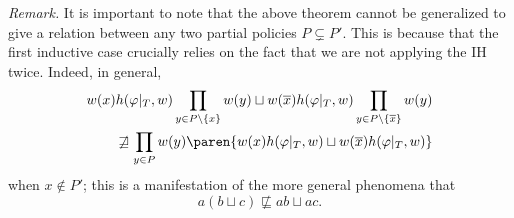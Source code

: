 \noindent
\textit{Remark.} 
It is important to note that the above theorem 
cannot be generalized to give a relation between 
any two partial policies $P \subsetneq P'$. 
This is because that the first inductive case 
crucially relies on the fact that 
we are not applying the IH twice. 
Indeed, in general,
\begin{align*}
   w(x)h(\varphi|_T,w)\prod_{y \in P\setminus \{x\}}w(y) 
    \sqcup w(\overline x)h(\varphi|_T,w)\prod_{y \in P\setminus \{\overline x\}} w(y) 
  \\\quad 
   \not\sqsupseteq 
  \prod_{y \in P } w(y) \paren{w(x)h(\varphi|_T,w) \sqcup w(\overline x) h(\varphi|_T,w)}
\end{align*}
when $x \notin P'$; this is a manifestation of the more general phenomena that
$$a(b \sqcup c) \not \sqsubseteq ab \sqcup ac.$$